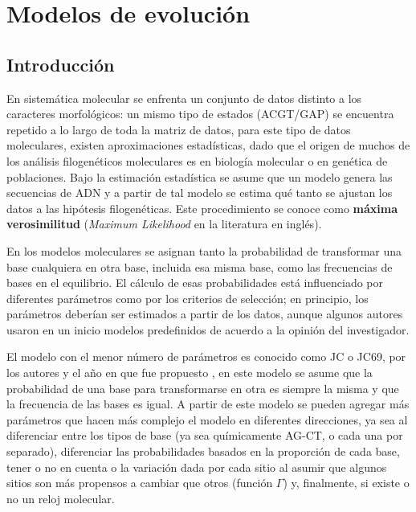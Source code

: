 %
%
\chapter{Modelos de evoluci\'on}


\section*{Introducci\'on}

\label{ch:molecular}
En sistem\'atica molecular se enfrenta un conjunto de datos distinto  a los caracteres morfol\'ogicos:  un mismo tipo de estados (ACGT/GAP) se encuentra repetido a lo largo de toda la matriz de datos, para este tipo de datos moleculares, existen aproximaciones estad\'isticas, dado que el origen de muchos de los an\'alisis filogen\'eticos moleculares es en biolog\'ia molecular o en gen\'etica de poblaciones. Bajo la estimaci\'on estad\'istica se asume que un modelo genera las secuencias de ADN y a partir de tal modelo se estima qu\'e tanto se ajustan los datos a las hip\'otesis filogen\'eticas. Este procedimiento se conoce como \textbf{m\'axima verosimilitud} (\textit{Maximum Likelihood} en la literatura en ingl\'es).

En los modelos moleculares se asignan tanto la probabilidad de transformar una base cualquiera en otra base, incluida esa misma base, como las frecuencias de bases en el equilibrio. El c\'alculo de esas probabilidades est\'a influenciado por diferentes par\'ametros como por los criterios de selecci\'on; en principio, los par\'ametros deber\'ian ser estimados a partir  de los datos, aunque algunos autores usaron en un inicio modelos predefinidos de acuerdo a la opini\'on del investigador.

El modelo con el menor n\'umero de par\'ametros es conocido como JC o JC69, por los autores y el a\~no en que fue propuesto \citep{Jukes1969}, en este modelo se asume que la probabilidad de una base para transformarse en otra es siempre la misma y que la frecuencia de las bases es igual. A partir de este modelo se pueden agregar m\'as par\'ametros que hacen m\'as complejo el modelo en diferentes direcciones, ya sea al diferenciar entre los tipos de base (ya sea qu\'imicamente AG-CT, o cada una por separado), diferenciar las probabilidades basados en la proporci\'on de cada base, tener o no en cuenta o la variaci\'on dada por cada sitio al asumir que algunos sitios son m\'as propensos a cambiar que otros (funci\'on $\Gamma$) y, finalmente, si existe o no un reloj molecular.

